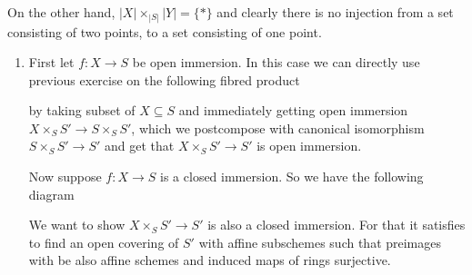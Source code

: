 \begin{exercise}{1}
\begin{enumerate}
{            On the other hand, $| X | \times_{| S |} | Y |=\lbrace * \rbrace$
            and clearly there is no injection from a set consisting of two
            points, to a set consisting of one point.
            }
    \end{enumerate}
\end{exercise}

\begin{exercise}{2}
    \begin{enumerate}
        \item{
            First let $f \colon X \rightarrow S$ be open immersion. In this case
            we can directly use previous exercise on the following fibred
            product
                      
        \begin{center}
        \end{center}
        
            by taking subset of $X \subseteq S$ and immediately getting open
            immersion $X \times_S S' \rightarrow S \times_S S'$, which we
            postcompose with canonical isomorphism $S \times_S S' \rightarrow
            S'$ and get that $X \times_S S' \rightarrow S'$ is open immersion.

            Now suppose $f \colon X \rightarrow S$ is a closed immersion. So we
            have the following diagram

            \begin{center}
            \end{center}

            We want to show $X \times_S S' \rightarrow S'$ is also a closed
            immersion. For that it satisfies to find an open covering of $S'$
            with affine subschemes such that preimages with be also affine schemes
            and induced maps of rings surjective.

}
\end{enumerate}
\end{exercise}
